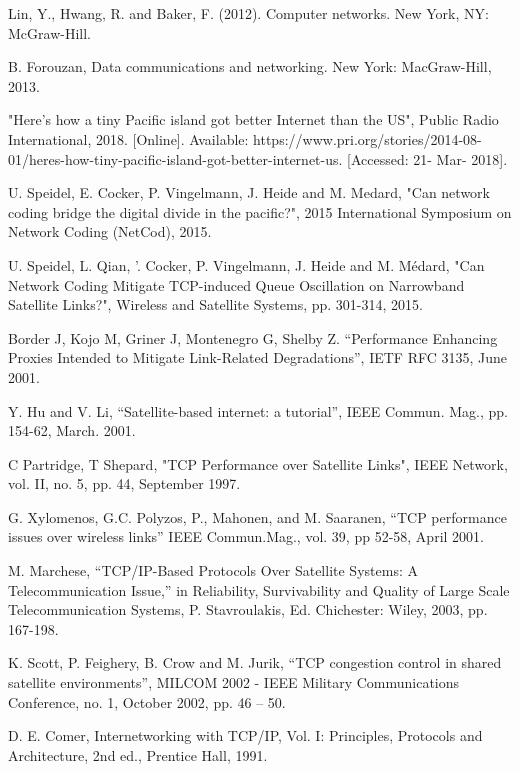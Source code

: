 
 Lin, Y., Hwang, R. and Baker, F. (2012). Computer networks. New York, NY: McGraw-Hill. 

 B. Forouzan, Data communications and networking. New York: MacGraw-Hill, 2013.

 "Here's how a tiny Pacific island got better Internet than the US", Public Radio International, 2018. [Online]. Available: https://www.pri.org/stories/2014-08-01/heres-how-tiny-pacific-island-got-better-internet-us. [Accessed: 21- Mar- 2018].

 U. Speidel, E. Cocker, P. Vingelmann, J. Heide and M. Medard, "Can network coding bridge the digital divide in the pacific?", 2015 International Symposium on Network Coding (NetCod), 2015.

 U. Speidel, L. Qian, ’. Cocker, P. Vingelmann, J. Heide and M. Médard, "Can Network Coding Mitigate TCP-induced Queue Oscillation on Narrowband Satellite Links?", Wireless and Satellite Systems, pp. 301-314, 2015.

 Border J, Kojo M, Griner J, Montenegro G, Shelby Z. “Performance Enhancing Proxies Intended to Mitigate Link-Related Degradations”, IETF RFC 3135, June 2001.

 Y. Hu and V. Li, “Satellite-based internet: a tutorial”, IEEE Commun. Mag., pp. 154-62, March. 2001.

 C Partridge, T Shepard, "TCP Performance over Satellite Links", IEEE Network, vol. II, no. 5, pp. 44, September 1997.

 G. Xylomenos, G.C. Polyzos, P., Mahonen, and M. Saaranen, “TCP performance issues over wireless links” IEEE Commun.Mag., vol. 39, pp 52-58, April 2001.

 M. Marchese, “TCP/IP-Based Protocols Over Satellite Systems: A Telecommunication Issue,” in Reliability, Survivability and Quality of Large Scale Telecommunication Systems, P. Stavroulakis, Ed. Chichester: Wiley, 2003, pp. 167-198.

 K. Scott, P. Feighery, B. Crow and M. Jurik, “TCP congestion control in shared satellite environments”, MILCOM 2002 - IEEE Military Communications Conference, no. 1, October 2002, pp. 46 – 50.  

 D. E. Comer, Internetworking with TCP/IP, Vol. I: Principles, Protocols and Architecture, 2nd ed., Prentice Hall, 1991. 

